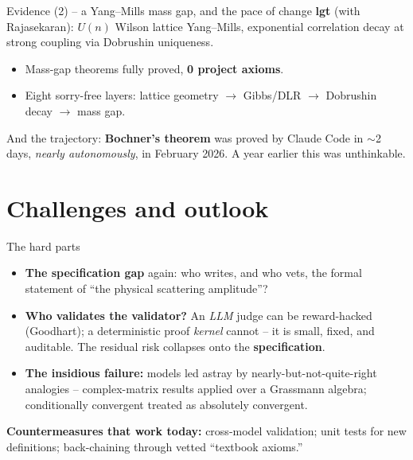 \documentclass[aspectratio=169,xcolor=dvipsnames]{beamer}
\begin{document}
\begin{frame}{Evidence (2) -- a Yang--Mills mass gap, and the pace of change}
\textbf{lgt} (with Rajasekaran): $U(n)$ Wilson lattice Yang--Mills, exponential
correlation decay at strong coupling via Dobrushin uniqueness.
\begin{itemize}
  \item Mass-gap theorems fully proved, \textbf{0 project axioms}.
  \item Eight sorry-free layers: lattice geometry $\to$ Gibbs/DLR $\to$ Dobrushin decay $\to$ mass gap.
\end{itemize} \pause
\smallskip
And the trajectory: \textbf{Bochner's theorem} was proved by Claude Code in $\sim$2 days,
\emph{nearly autonomously}, in February 2026.  A year earlier this was unthinkable.
\end{frame}

\section{Challenges and outlook}
\begin{frame}{The hard parts}
\begin{itemize}
  \item \textbf{The specification gap} again: who writes, and who vets, the formal statement of
        ``the physical scattering amplitude''?
  \item \textbf{Who validates the validator?}  An \emph{LLM} judge can be reward-hacked
        (Goodhart); a deterministic proof \emph{kernel} cannot -- it is small, fixed, and
        auditable.  The residual risk collapses onto the \textbf{specification}.
  \item \textbf{The insidious failure:} models led astray by nearly-but-not-quite-right analogies
        -- complex-matrix results applied over a Grassmann algebra; conditionally convergent
        treated as absolutely convergent.
\end{itemize} \pause
\smallskip
\textbf{Countermeasures that work today:} cross-model validation; unit tests for new definitions;
back-chaining through vetted ``textbook axioms.''
\end{frame}
\end{document}
